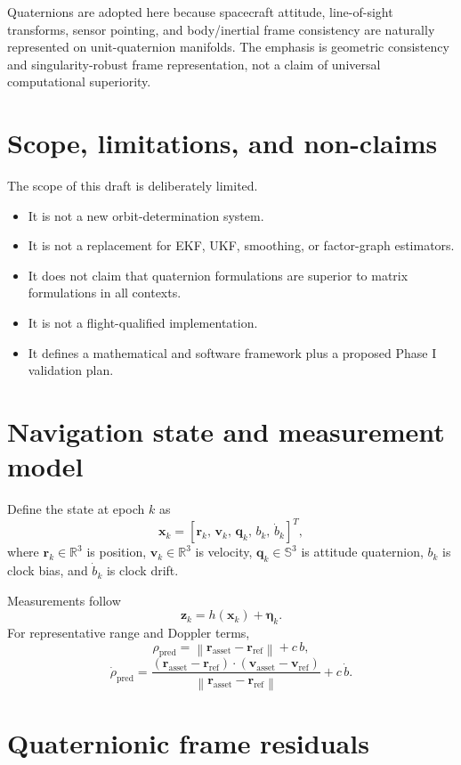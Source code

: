 \documentclass[11pt]{article}
\theoremstyle{remark}
\newcommand{\R}{\mathbb{R}}
\newcommand{\Sthree}{\mathbb{S}^3}
\newcommand{\norm}[1]{\left\lVert #1 \right\rVert}
\begin{document}
Quaternions are adopted here because spacecraft attitude, line-of-sight transforms, sensor pointing, and body/inertial frame consistency are naturally represented on unit-quaternion manifolds. The emphasis is geometric consistency and singularity-robust frame representation, not a claim of universal computational superiority.

\section{Scope, limitations, and non-claims}

The scope of this draft is deliberately limited.
\begin{itemize}[leftmargin=1.5em]
    \item It is not a new orbit-determination system.
    \item It is not a replacement for EKF, UKF, smoothing, or factor-graph estimators.
    \item It does not claim that quaternion formulations are superior to matrix formulations in all contexts.
    \item It is not a flight-qualified implementation.
    \item It defines a mathematical and software framework plus a proposed Phase I validation plan.
\end{itemize}

\section{Navigation state and measurement model}

Define the state at epoch $k$ as
\[
\mathbf{x}_k = [\mathbf{r}_k,\, \mathbf{v}_k,\, \mathbf{q}_k,\, b_k,\, \dot{b}_k]^T,
\]
where $\mathbf{r}_k\in\R^3$ is position, $\mathbf{v}_k\in\R^3$ is velocity, $\mathbf{q}_k\in\Sthree$ is attitude quaternion, $b_k$ is clock bias, and $\dot{b}_k$ is clock drift.

Measurements follow
\[
\mathbf{z}_k = h(\mathbf{x}_k) + \boldsymbol{\eta}_k.
\]
For representative range and Doppler terms,
\[
\rho_{\text{pred}} = \norm{\mathbf{r}_{\text{asset}}-\mathbf{r}_{\text{ref}}} + c\,b,
\]
\[
\dot{\rho}_{\text{pred}} =
\frac{(\mathbf{r}_{\text{asset}}-\mathbf{r}_{\text{ref}})\cdot(\mathbf{v}_{\text{asset}}-\mathbf{v}_{\text{ref}})}
{\norm{\mathbf{r}_{\text{asset}}-\mathbf{r}_{\text{ref}}}} + c\,\dot{b}.
\]

\section{Quaternionic frame residuals}
\end{document}
